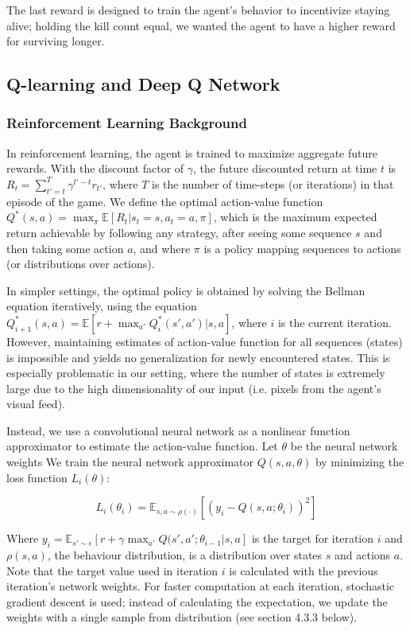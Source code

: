 \documentclass{article}
\begin{document}
\begin{multicols}{2}
The last reward is designed to train the agent's behavior to incentivize staying alive; holding the kill count equal, we wanted the agent to have a higher reward for surviving longer.

\subsection{Q-learning and Deep Q Network}

\subsubsection{Reinforcement Learning Background}

In reinforcement learning, the agent is trained to maximize aggregate future rewards. With the discount factor of $\gamma$, the future discounted return at time $t$ is $R_t = \sum_{t' = t}^T \gamma^{t' - t}r_{t'}$, where $T$ is the number of time-steps (or iterations) in that episode of the game.
We define the optimal action-value function
$Q^{*}(s, a) = \max_\pi \mathbb{E}[R_t | s_t = s, a_t = a, \pi]$,
which is the maximum expected return achievable by following any strategy,
after seeing some sequence $s$ and then taking some action $a$, and where $\pi$ is a policy mapping sequences to actions (or distributions over actions).

In simpler settings, the optimal policy is obtained by solving the Bellman equation iteratively, using the equation $Q_{i+1}^*(s,a) = \mathbb{E}[r +  \max_{a'} Q_i^* (s', a' )| s, a]$, where $i$ is the current iteration.
However, maintaining estimates of action-value function for all sequences (states) is impossible and yields no generalization for newly encountered states.
This is especially problematic in our setting, where the number of states is extremely large due to the high dimensionality of our input (i.e. pixels from the agent's visual feed).

Instead, we use a convolutional neural network as a nonlinear function approximator to estimate the action-value function. Let $\theta$ be the neural network weights We train the neural network approximator $Q(s,a,\theta)$ by minimizing the loss function $L_i(\theta)$:

\begin{equation*}
    L_i(\theta_i) = \mathbb{E}_{s,a \sim \rho(·)} [(y_i - Q (s, a; \theta_i))^2]
\end{equation*}


Where $y_i = \mathbb{E}_{s' \sim \epsilon}[r + \gamma \max_{a'} Q(s', a'; \theta_{i-1} | s, a]$ is the target for iteration $i$ and $\rho(s, a)$, the behaviour distribution, is a distribution over states $s$ and actions $a$.
Note that the target value used in iteration $i$ is calculated with the previous iteration's network weights. For faster computation at each iteration, stochastic gradient descent is used; instead of calculating the expectation, we update the weights with a single sample from distribution (see section 4.3.3 below).


\end{multicols}
\end{document}
